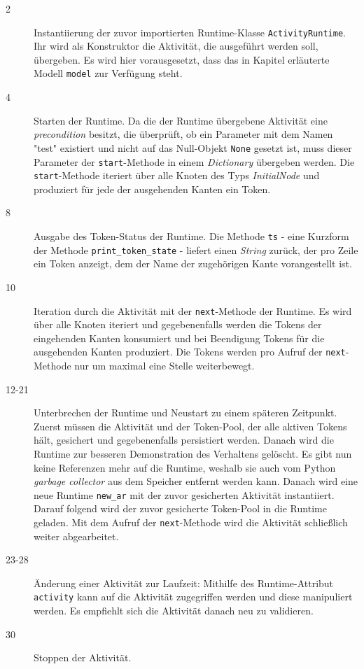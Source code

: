 \begin{description}
\item[2] Instantiierung der zuvor importierten Runtime-Klasse \texttt{ActivityRuntime}. Ihr wird als Konstruktor die Aktivität, die ausgeführt werden soll, übergeben. Es wird hier vorausgesetzt, dass das in Kapitel  erläuterte Modell \texttt{model} zur Verfügung steht.
\item[4] Starten der Runtime. Da die der Runtime übergebene Aktivität eine \emph{precondition} besitzt, die überprüft, ob ein Parameter mit dem Namen "test" existiert und nicht auf das Null-Objekt \texttt{None} gesetzt ist, muss dieser Parameter der \texttt{start}-Methode in einem \emph{Dictionary} übergeben werden. Die \texttt{start}-Methode iteriert über alle Knoten des Typs \emph{InitialNode} und produziert für jede der ausgehenden Kanten ein Token.
\item[8] Ausgabe des Token-Status der Runtime. Die Methode \texttt{ts} - eine Kurzform der Methode \texttt{print\_token\_state} - liefert einen \emph{String} zurück, der pro Zeile ein Token anzeigt, dem der Name der zugehörigen Kante vorangestellt ist.
\item[10] Iteration durch die Aktivität mit der \texttt{next}-Methode der Runtime. Es wird über alle Knoten iteriert und gegebenenfalls werden die Tokens der eingehenden Kanten konsumiert und bei Beendigung Tokens für die ausgehenden Kanten produziert. Die Tokens werden pro Aufruf der \texttt{next}-Methode nur um maximal eine Stelle weiterbewegt.
\item[12-21] Unterbrechen der Runtime und Neustart zu einem späteren Zeitpunkt. Zuerst müssen die Aktivität und der Token-Pool, der alle aktiven Tokens hält, gesichert und gegebenenfalls persistiert werden. Danach wird die Runtime zur besseren Demonstration des Verhaltens gelöscht. Es gibt nun keine Referenzen mehr auf die Runtime, weshalb sie auch vom Python \emph{garbage collector} aus dem Speicher entfernt werden kann. Danach wird eine neue Runtime \texttt{new\_ar} mit der zuvor gesicherten Aktivität instantiiert. Darauf folgend wird der zuvor gesicherte Token-Pool in die Runtime geladen. Mit dem Aufruf der \texttt{next}-Methode wird die Aktivität schließlich weiter abgearbeitet.
\item[23-28] Änderung einer Aktivität zur Laufzeit: Mithilfe des Runtime-Attribut \texttt{activity} kann auf die Aktivität zugegriffen werden und diese manipuliert werden. Es empfiehlt sich die Aktivität danach neu zu validieren. \item[30] Stoppen der Aktivität.
\end{description}












